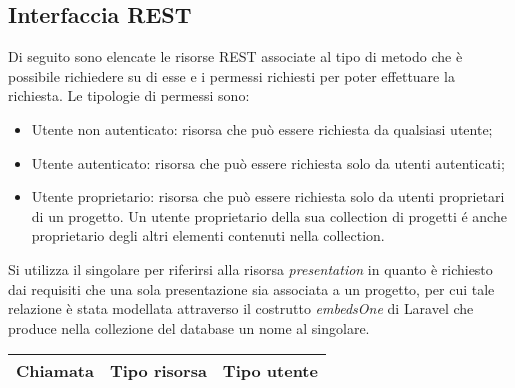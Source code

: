 \subsection{Interfaccia REST}
Di seguito sono elencate le risorse \gls{REST} associate al tipo di metodo che è possibile richiedere su di esse e i permessi richiesti per poter effettuare la richiesta.
Le tipologie di permessi sono:
\begin{itemize}
	\item Utente non autenticato: risorsa che può essere richiesta da qualsiasi utente;
	\item Utente autenticato: risorsa che può essere richiesta solo da utenti autenticati;
	\item Utente proprietario: risorsa che può essere richiesta solo da utenti proprietari di un progetto. Un utente proprietario della sua collection di progetti é anche proprietario degli altri elementi contenuti nella collection.
\end{itemize}
\noindent Si utilizza il singolare per riferirsi alla risorsa \textit{presentation} in quanto è richiesto dai requisiti che una sola presentazione sia associata a un progetto, per cui tale relazione è stata modellata attraverso il costrutto \textit{embedsOne} di \gls{Laravel} che produce nella collezione del database un nome al singolare.
\newpage
\begin{table}[h]
	\begin{tabular}{|p{}|p{}|p{}|}
		\toprule
		
		\textbf{Chiamata} & \textbf{Tipo risorsa}  & \textbf{Tipo utente} \\
		\bottomrule
	\end{tabular}\\	
\end{table}

